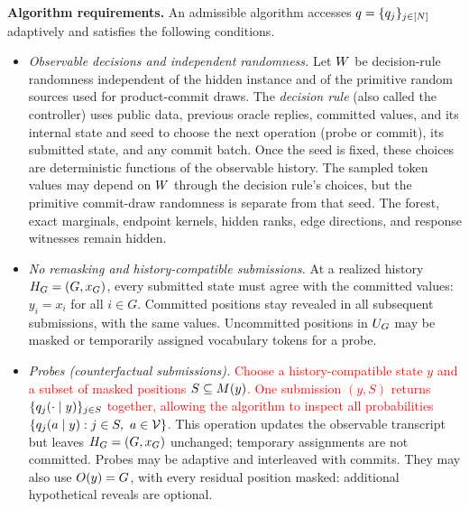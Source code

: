 \begin{definition}[\textcolor{red}{Admissible algorithms}]
\label{app:def:admissible-algorithm}
\textbf{Algorithm requirements.}
An admissible algorithm accesses
$\FrozenOracle=\{\FrozenOracle_j\}_{j\in\PositionSet}$ adaptively and
satisfies the following conditions.
\begin{itemize}
\item \emph{Observable decisions and independent randomness.}
Let $\ControllerSeed$ be decision-rule randomness independent of the hidden
instance and of the primitive random sources used for product-commit draws.
The \emph{decision rule} (also called the controller) uses public data,
previous oracle replies, committed values, and its internal state and seed
to choose the next operation (probe or commit), its submitted state, and
any commit batch. Once the seed is fixed,
these choices are deterministic functions of the observable history.
The sampled token values may depend on $\ControllerSeed$ through the
decision rule's choices, but the primitive commit-draw randomness is
separate from that seed. The forest, exact marginals, endpoint kernels,
hidden ranks, edge directions, and response witnesses remain hidden.

\item \emph{No remasking and history-compatible submissions.}
At a realized history $\History=(G,x_G)$, every submitted state must agree
with the committed values: $y_i=x_i$ for all $i\in G$.
Committed positions stay revealed in all subsequent submissions, with the
same values. Uncommitted positions in $\ResidualPositions$ may be masked
or temporarily assigned vocabulary tokens for a probe.

\item \emph{Probes (counterfactual submissions).}
\textcolor{red}{Choose a history-compatible state $y$ and a subset of masked
positions $S\subseteq\MaskSet{y}$. One submission $(y,S)$ returns
$\{\OracleRow{y}{j}\}_{j\in S}$ together, allowing the algorithm to inspect
all probabilities $\{\OracleRowMass{y}{j}{a}:j\in S,\ a\in\Vocab\}$.}
This operation updates the observable transcript but leaves
$\History=(G,x_G)$ unchanged; temporary assignments are not committed.
Probes may be adaptive and interleaved with commits.
They may also use $\ObservedSet{y}=G$, with every residual position masked:
additional hypothetical reveals are optional.


\end{itemize}
\end{definition}
